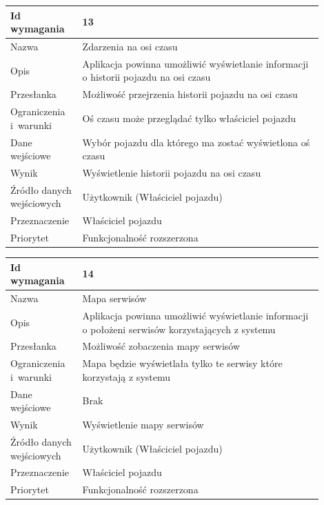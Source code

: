 \documentclass[12pt]{article}
\begin{document}
\begin{table}[H]
\begin{center}
	\begin{tabular}{|p{0.18\linewidth}|p{0.72\linewidth}|}%
	\hline
	Id wymagania 	& 13 				\\ \hline
	Nazwa			& Zdarzenia na osi czasu \\ \hline
	Opis &Aplikacja powinna umożliwić wyświetlanie informacji o historii pojazdu na osi czasu
\\ \hline
	Przesłanka & Możliwość przejrzenia historii pojazdu na osi czasu \\ \hline
	Ograniczenia i~warunki & Oś czasu może przeglądać tylko właściciel pojazdu \\ \hline
	Dane wejściowe & Wybór pojazdu dla którego ma zostać wyświetlona oś czasu \\ \hline
	Wynik &Wyświetlenie historii pojazdu na osi czasu\\ \hline
	Źródło danych wejściowych &Użytkownik (Właściciel pojazdu)\\ \hline
	Przeznaczenie & Właściciel pojazdu\\ \hline
	Priorytet & Funkcjonalność rozszerzona \\ \hline
	\end{tabular}
\end{center}
\end{table}
\begin{table}[H]
\begin{center}
	\begin{tabular}{|p{0.18\linewidth}|p{0.72\linewidth}|}%
	\hline
	Id wymagania 	& 14				\\ \hline
	Nazwa			& Mapa serwisów \\ \hline
	Opis &Aplikacja powinna umożliwić wyświetlanie informacji o położeni serwisów korzystających z systemu
\\ \hline
	Przesłanka & Możliwość zobaczenia mapy serwisów \\ \hline
	Ograniczenia i~warunki & Mapa będzie wyświetlała tylko te serwisy które korzystają z systemu\\ \hline
	Dane wejściowe & Brak \\ \hline
	Wynik &Wyświetlenie mapy serwisów\\ \hline
	Źródło danych wejściowych &Użytkownik (Właściciel pojazdu)\\ \hline
	Przeznaczenie & Właściciel pojazdu\\ \hline
	Priorytet & Funkcjonalność rozszerzona \\ \hline
	\end{tabular}
\end{center}
\end{table}
\newpage
\end{document}
